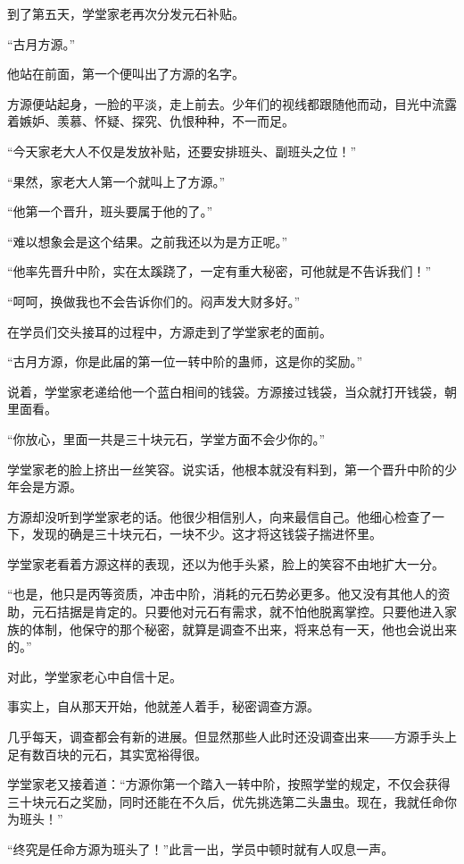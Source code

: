 \begin{this_body}
到了第五天，学堂家老再次分发元石补贴。

“古月方源。”

他站在前面，第一个便叫出了方源的名字。

方源便站起身，一脸的平淡，走上前去。少年们的视线都跟随他而动，目光中流露着嫉妒、羡慕、怀疑、探究、仇恨种种，不一而足。

“今天家老大人不仅是发放补贴，还要安排班头、副班头之位！”

“果然，家老大人第一个就叫上了方源。”

“他第一个晋升，班头要属于他的了。”

“难以想象会是这个结果。之前我还以为是方正呢。”

“他率先晋升中阶，实在太蹊跷了，一定有重大秘密，可他就是不告诉我们！”

“呵呵，换做我也不会告诉你们的。闷声发大财多好。”

在学员们交头接耳的过程中，方源走到了学堂家老的面前。

“古月方源，你是此届的第一位一转中阶的蛊师，这是你的奖励。”

说着，学堂家老递给他一个蓝白相间的钱袋。方源接过钱袋，当众就打开钱袋，朝里面看。

“你放心，里面一共是三十块元石，学堂方面不会少你的。”

学堂家老的脸上挤出一丝笑容。说实话，他根本就没有料到，第一个晋升中阶的少年会是方源。

方源却没听到学堂家老的话。他很少相信别人，向来最信自己。他细心检查了一下，发现的确是三十块元石，一块不少。这才将这钱袋子揣进怀里。

学堂家老看着方源这样的表现，还以为他手头紧，脸上的笑容不由地扩大一分。

“也是，他只是丙等资质，冲击中阶，消耗的元石势必更多。他又没有其他人的资助，元石拮据是肯定的。只要他对元石有需求，就不怕他脱离掌控。只要他进入家族的体制，他保守的那个秘密，就算是调查不出来，将来总有一天，他也会说出来的。”

对此，学堂家老心中自信十足。

事实上，自从那天开始，他就差人着手，秘密调查方源。

几乎每天，调查都会有新的进展。但显然那些人此时还没调查出来――方源手头上足有数百块的元石，其实宽裕得很。

学堂家老又接着道：“方源你第一个踏入一转中阶，按照学堂的规定，不仅会获得三十块元石之奖励，同时还能在不久后，优先挑选第二头蛊虫。现在，我就任命你为班头！”

“终究是任命方源为班头了！”此言一出，学员中顿时就有人叹息一声。


\end{this_body}
